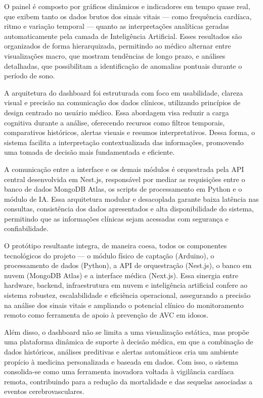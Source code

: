 O painel é composto por gráficos dinâmicos e indicadores em tempo quase real, que exibem tanto os dados brutos dos sinais vitais — como frequência cardíaca, ritmo e variação temporal — quanto as interpretações analíticas geradas automaticamente pela camada de Inteligência Artificial. Esses resultados são organizados de forma hierarquizada, permitindo ao médico alternar entre visualizações macro, que mostram tendências de longo prazo, e análises detalhadas, que possibilitam a identificação de anomalias pontuais durante o período de sono.

A arquitetura do dashboard foi estruturada com foco em usabilidade, clareza visual e precisão na comunicação dos dados clínicos, utilizando princípios de design centrado no usuário médico. Essa abordagem visa reduzir a carga cognitiva durante a análise, oferecendo recursos como filtros temporais, comparativos históricos, alertas visuais e resumos interpretativos. Dessa forma, o sistema facilita a interpretação contextualizada das informações, promovendo uma tomada de decisão mais fundamentada e eficiente.

A comunicação entre a interface e os demais módulos é orquestrada pela API central desenvolvida em Nest.js, responsável por mediar as requisições entre o banco de dados MongoDB Atlas, os scripts de processamento em Python e o módulo de IA. Essa arquitetura modular e desacoplada garante baixa latência nas consultas, consistência dos dados apresentados e alta disponibilidade do sistema, permitindo que as informações clínicas sejam acessadas com segurança e confiabilidade.

O protótipo resultante integra, de maneira coesa, todos os componentes tecnológicos do projeto — o módulo físico de captação (Arduino), o processamento de dados (Python), a API de orquestração (Nest.js), o banco em nuvem (MongoDB Atlas) e a interface médica (Next.js). Essa sinergia entre hardware, backend, infraestrutura em nuvem e inteligência artificial confere ao sistema robustez, escalabilidade e eficiência operacional, assegurando a precisão na análise dos sinais vitais e ampliando o potencial clínico do monitoramento remoto como ferramenta de apoio à prevenção de AVC em idosos.

Além disso, o dashboard não se limita a uma visualização estática, mas propõe uma plataforma dinâmica de suporte à decisão médica, em que a combinação de dados históricos, análises preditivas e alertas automáticos cria um ambiente propício à medicina personalizada e baseada em dados. Com isso, o sistema consolida-se como uma ferramenta inovadora voltada à vigilância cardíaca remota, contribuindo para a redução da mortalidade e das sequelas associadas a eventos cerebrovasculares.